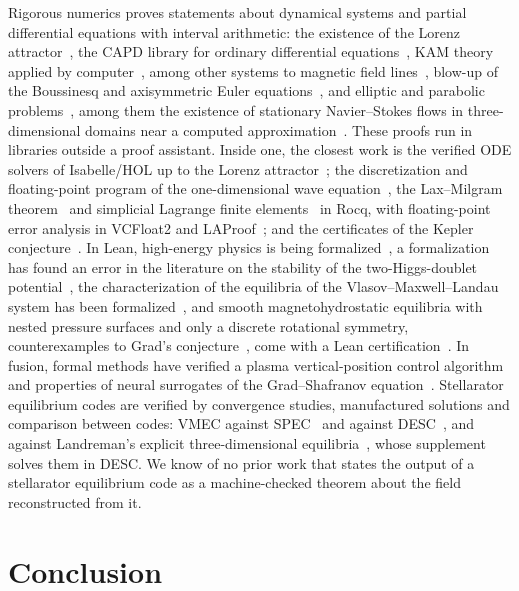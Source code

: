 \documentclass[11pt]{article}
\begin{document}
Rigorous numerics proves statements about dynamical systems and partial
differential equations with interval arithmetic: the existence of the Lorenz
attractor~\cite{tucker1999}, the CAPD library for ordinary differential
equations~\cite{capd2021}, KAM theory applied by computer~\cite{figueras2017},
among other systems to magnetic field lines~\cite{valvo2021}, blow-up of the
Boussinesq and axisymmetric Euler equations~\cite{chen2023}, and elliptic and
parabolic problems~\cite{nakao2019}, among them the existence of stationary
Navier--Stokes flows in three-dimensional domains near a computed
approximation~\cite{liu2021}. These proofs run in libraries outside a proof
assistant. Inside one, the closest work is the verified ODE solvers of
Isabelle/HOL up to the Lorenz attractor~\cite{immler2012,immler2018}; the
discretization and floating-point program of the one-dimensional wave
equation~\cite{boldo2013}, the Lax--Milgram theorem~\cite{boldo2017} and
simplicial Lagrange finite elements~\cite{boldo2026} in Rocq, with
floating-point error analysis in VCFloat2 and LAProof~\cite{appel2024,kellison2023};
and the certificates of the Kepler conjecture~\cite{hales2017}. In Lean, high-energy
physics is being formalized~\cite{toobysmith2025}, a formalization has found an
error in the literature on the stability of the two-Higgs-doublet
potential~\cite{toobysmith2026}, the characterization of the equilibria of the
Vlasov--Maxwell--Landau system has been formalized~\cite{ilin2026}, and smooth
magnetohydrostatic equilibria with nested pressure surfaces and only a discrete
rotational symmetry, counterexamples to Grad's conjecture~\cite{grad1967}, come
with a Lean certification~\cite{gomezserrano2026}. In fusion, formal methods
have verified a plasma vertical-position control algorithm~\cite{wu2020} and
properties of neural surrogates of the Grad--Shafranov
equation~\cite{rizqan2025}. Stellarator equilibrium codes are verified by
convergence studies, manufactured solutions and comparison between codes: VMEC
against SPEC~\cite{hudson2012,loizu2015,lazerson2016} and against
DESC~\cite{dudt2020,panici2023}, and against Landreman's explicit
three-dimensional equilibria~\cite{landreman2026}, whose supplement solves them
in DESC. We know of no prior work that states the output of a stellarator
equilibrium code as a machine-checked theorem about the field reconstructed
from it.

\section{Conclusion}
\end{document}
